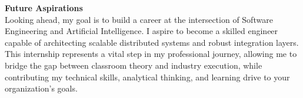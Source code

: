 \documentclass[a4paper,11pt]{article}
\begin{document}
\begin{justify}
\textbf{Future Aspirations} \\
Looking ahead, my goal is to build a career at the intersection of Software Engineering and Artificial Intelligence. I aspire to become a skilled engineer capable of architecting scalable distributed systems and robust integration layers. This internship represents a vital step in my professional journey, allowing me to bridge the gap between classroom theory and industry execution, while contributing my technical skills, analytical thinking, and learning drive to your organization's goals.

\end{justify}
\end{document}
